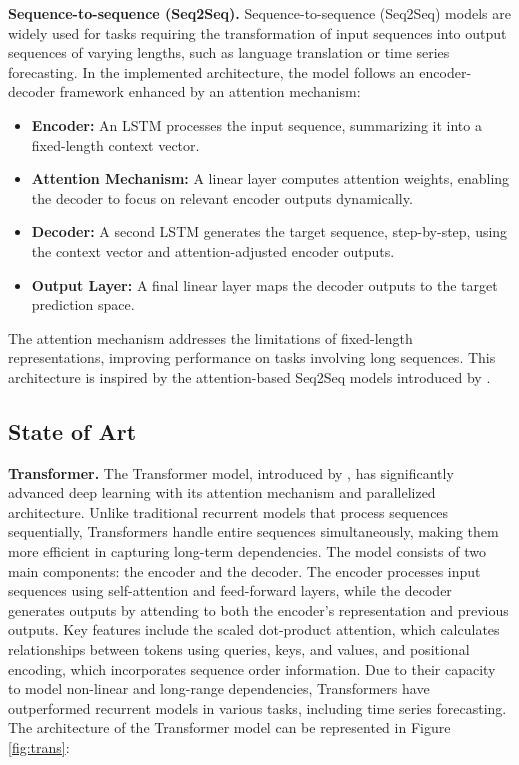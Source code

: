 \documentclass{scrartcl}
\begin{document}
\textbf{Sequence-to-sequence (Seq2Seq).}
Sequence-to-sequence (Seq2Seq) models are widely used for tasks requiring the transformation of input sequences into output sequences of varying lengths, such as language translation or time series forecasting. In the implemented architecture, the model follows an encoder-decoder framework enhanced by an attention mechanism:
\begin{itemize}
    \item \textbf{Encoder:} An LSTM processes the input sequence, summarizing it into a fixed-length context vector.
    \item \textbf{Attention Mechanism:} A linear layer computes attention weights, enabling the decoder to focus on relevant encoder outputs dynamically.
    \item \textbf{Decoder:} A second LSTM generates the target sequence, step-by-step, using the context vector and attention-adjusted encoder outputs.
    \item \textbf{Output Layer:} A final linear layer maps the decoder outputs to the target prediction space.
\end{itemize}
The attention mechanism addresses the limitations of fixed-length representations, improving performance on tasks involving long sequences. This architecture is inspired by the attention-based Seq2Seq models introduced by \cite{bahdanau2014neural}.

\subsection{State of Art}
\textbf{Transformer.}
The Transformer model, introduced by \cite{vaswani2017attention}, has significantly advanced deep learning with its attention mechanism and parallelized architecture. Unlike traditional recurrent models that process sequences sequentially, Transformers handle entire sequences simultaneously, making them more efficient in capturing long-term dependencies. The model consists of two main components: the encoder and the decoder. The encoder processes input sequences using self-attention and feed-forward layers, while the decoder generates outputs by attending to both the encoder's representation and previous outputs. Key features include the scaled dot-product attention, which calculates relationships between tokens using queries, keys, and values, and positional encoding, which incorporates sequence order information. Due to their capacity to model non-linear and long-range dependencies, Transformers have outperformed recurrent models in various tasks, including time series forecasting. The architecture of the Transformer model
can be represented in Figure \ref{fig:trans}:
\end{document}
